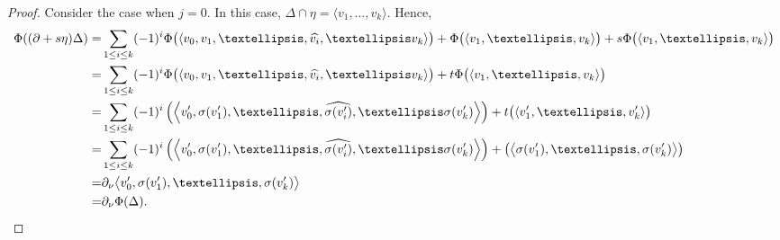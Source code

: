 \documentclass[10pt,a4paper]{amsart}
\begin{document}
\begin{proof}
Consider the case when $j=0$. In this case, $\Delta\cap \eta=\langle v_1, \ldots, v_k\rangle$. Hence,
\begin{align*}
\Phi((\partial+s\eta)\Delta)=&\sum_{1\leq i\leq k}(-1)^i\Phi\big(\langle v_0, v_1, \ldots, \widehat{v_i}, \ldots v_k\rangle\big)+\Phi\big(\langle v_1, \ldots, v_k\rangle\big)+s\Phi\big(\langle v_1, \ldots, v_k\rangle\big)\\
=&\sum_{1\leq i\leq k}(-1)^i\Phi\big(\langle v_0, v_1, \ldots, \widehat{v_i}, \ldots v_k\rangle\big)+t\Phi\big(\langle v_1, \ldots, v_k\rangle\big)\\
=&\sum_{1\leq i\leq k}(-1)^i\left(\Big\langle v'_0, \sigma(v'_1), \ldots, \widehat{\sigma(v'_i)}, \ldots \sigma(v'_k)\Big\rangle\right)+t\big(\langle v'_1, \ldots, v'_k\rangle\big)\\
=&\sum_{1\leq i\leq k}(-1)^i\left(\left\langle v'_0, \sigma(v'_1), \ldots, \widehat{\sigma(v'_i)}, \ldots \sigma(v'_k)\right\rangle\right)+\big(\big\langle \sigma(v'_1), \ldots, \sigma(v'_k)\big\rangle\big)\\
=&\partial_\nu \big\langle v'_0, \sigma(v'_1), \ldots,  \sigma(v'_k)\big\rangle\\
=&\partial_\nu\Phi(\Delta).\qedhere
\end{align*}
\end{proof}
\end{document}
